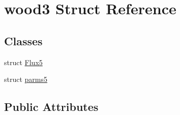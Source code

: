 \hypertarget{structwood3}{\section{wood3 Struct Reference}
\label{structwood3}
}
\subsection*{Classes}
\begin{DoxyCompactItemize}
\item 
struct \hyperlink{structwood3_1_1_flux5}{Flux5}
\item 
struct \hyperlink{structwood3_1_1parms5}{parms5}
\end{DoxyCompactItemize}
\subsection*{Public Attributes}

